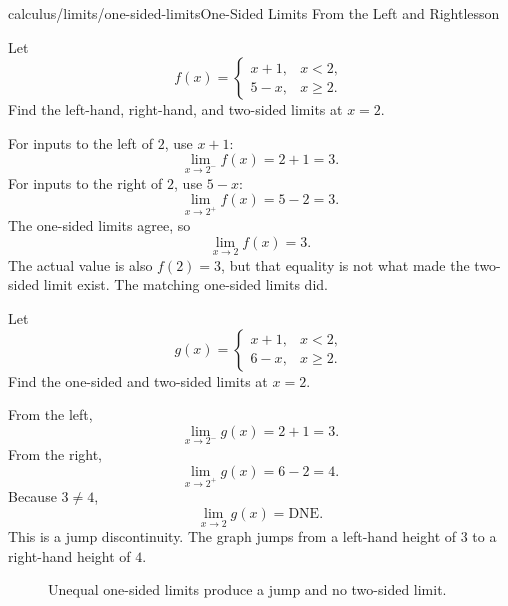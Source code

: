 \documentclass[11pt,openany]{book}
\theoremstyle{bgplain}
\newcounter{bgexample}[chapter]
\newcommand{\DNE}{\mathrm{DNE}}
\begin{document}
\begin{webpage}{calculus/limits/one-sided-limits}{One-Sided Limits From the Left and Right}{lesson}


\begin{bgexample}[title={A piecewise function with matching sides}]
Let
\[
  f(x)=
  \begin{cases}
    x+1,&x<2,\\
    5-x,&x\ge2.
  \end{cases}
\]
Find the left-hand, right-hand, and two-sided limits at \(x=2\).

\begin{bgsolution}
For inputs to the left of \(2\), use \(x+1\):
\[
  \lim_{x\to2^-}f(x)=2+1=3.
\]
For inputs to the right of \(2\), use \(5-x\):
\[
  \lim_{x\to2^+}f(x)=5-2=3.
\]
The one-sided limits agree, so
\[
  \boxed{\lim_{x\to2}f(x)=3}.
\]
The actual value is also \(f(2)=3\), but that equality is not what made the two-sided limit exist. The matching one-sided limits did.
\end{bgsolution}
\end{bgexample}

\begin{bgexample}[title={A jump}]
Let
\[
  g(x)=
  \begin{cases}
    x+1,&x<2,\\
    6-x,&x\ge2.
  \end{cases}
\]
Find the one-sided and two-sided limits at \(x=2\).

\begin{bgsolution}
From the left,
\[
  \lim_{x\to2^-}g(x)=2+1=3.
\]
From the right,
\[
  \lim_{x\to2^+}g(x)=6-2=4.
\]
Because \(3\ne4\),
\[
  \boxed{\lim_{x\to2}g(x)=\DNE}.
\]
This is a jump discontinuity. The graph jumps from a left-hand height of \(3\) to a right-hand height of \(4\).
\end{bgsolution}
\end{bgexample}

\begin{figure}[htbp]
\centering
{}
\caption{Unequal one-sided limits produce a jump and no two-sided limit.}
\label{fig:jump}
\end{figure}


\end{webpage}
\end{document}
